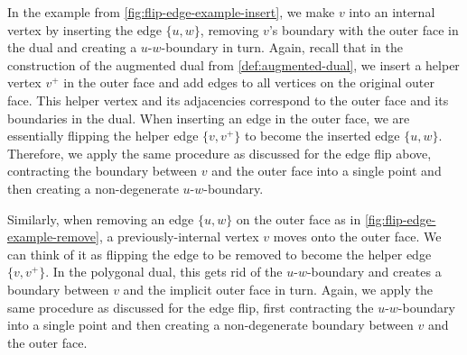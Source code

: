 In the example from \cref{fig:flip-edge-example-insert}, we make $v$ into an internal vertex by inserting the edge $\{u,w\}$, removing $v$'s boundary with the outer face in the dual and creating a $u$-$w$-boundary in turn.
Again, recall that in the construction of the augmented dual from \cref{def:augmented-dual}, we insert a helper vertex $v^+$ in the outer face and add edges to all vertices on the original outer face.
This helper vertex and its adjacencies correspond to the outer face and its boundaries in the dual.
When inserting an edge in the outer face, we are essentially flipping the helper edge $\{v,v^+\}$ to become the inserted edge $\{u,w\}$.
Therefore, we apply the same procedure as discussed for the edge flip above, contracting the boundary between $v$ and the outer face into a single point and then creating a non-degenerate $u$-$w$-boundary.

Similarly, when removing an edge $\{u,w\}$ on the outer face as in \cref{fig:flip-edge-example-remove}, a previously-internal vertex $v$ moves onto the outer face.
We can think of it as flipping the edge to be removed to become the helper edge $\{v,v^+\}$.
In the polygonal dual, this gets rid of the $u$-$w$-boundary and creates a boundary between $v$ and the implicit outer face in turn.
Again, we apply the same procedure as discussed for the edge flip, first contracting the $u$-$w$-boundary into a single point and then creating a non-degenerate boundary between $v$ and the outer face.
